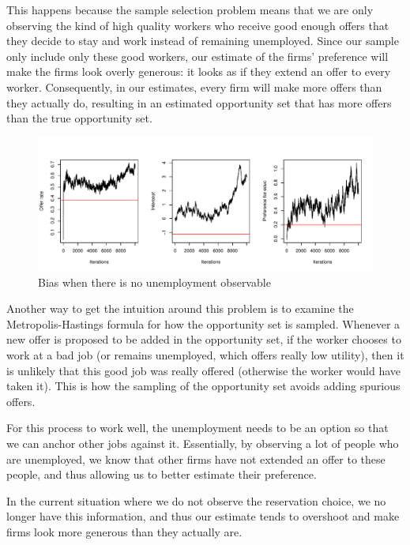 This happens because the sample selection problem means that we are only
observing the kind of high quality workers who receive good enough offers that
they decide to stay and work instead of remaining unemployed. Since our sample
only include only these good workers, our estimate of the firms' preference will
make the firms look overly generous: it looks as if they extend an offer to
every worker. Consequently, in our estimates, every firm will make more offers
than they actually do, resulting in an estimated opportunity set that has more
offers than the true opportunity set.

\begin{figure}[!ht]
  \centering
  \includegraphics[width=\textwidth,keepaspectratio]{../figure/sim_labor_nojobs_nounemp_managerial}
  \caption{Bias when there is no unemployment observable}
  \label{fig:sim_labor_nojobs_nounemp_managerial}
\end{figure}

Another way to get the intuition around this problem is to examine the
Metropolis-Hastings formula for how the opportunity set is sampled. Whenever a
new offer is proposed to be added in the opportunity set, if the worker chooses
to work at a bad job (or remains unemployed, which offers really low utility),
then it is unlikely that this good job was really offered (otherwise the worker
would have taken it). This is how the sampling of the opportunity set avoids
adding spurious offers.

For this process to work well, the unemployment needs to be an option so that we
can anchor other jobs against it. Essentially, by observing a lot of people who
are unemployed, we know that other firms have not extended an offer to these
people, and thus allowing us to better estimate their preference.

In the current situation where we do not observe the reservation choice, we no
longer have this information, and thus our estimate tends to overshoot and make
firms look more generous than they actually are.

